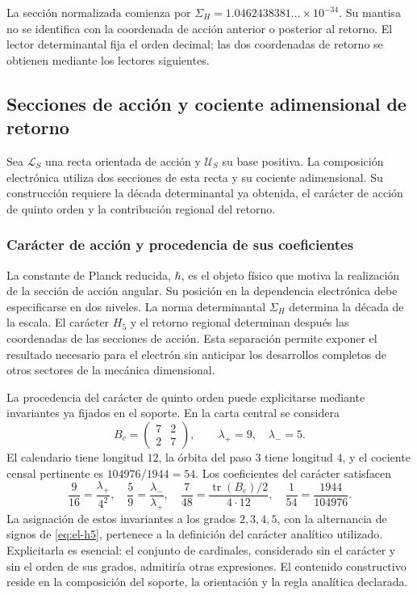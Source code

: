 La sección normalizada comienza por
\(\Sigma_H=1.0462438381\ldots\times10^{-34}\). Su mantisa no se
identifica con la coordenada de acción anterior o posterior al retorno.
El lector determinantal fija el orden decimal; las dos coordenadas de
retorno se obtienen mediante los lectores siguientes.


\subsection{Secciones de acción y cociente adimensional de retorno}

Sea \(\mathcal L_S\) una recta orientada de acción y \(\mathcal U_S\)
su base positiva. La composición electrónica utiliza dos secciones de
esta recta y su cociente adimensional. Su construcción requiere la
década determinantal ya obtenida, el carácter de acción de quinto orden
y la contribución regional del retorno.

\subsubsection{Carácter de acción y procedencia de sus coeficientes}
\label{sec:revision-planck}

La constante de Planck reducida, \(\hbar\), es el objeto físico que
motiva la realización de la sección de acción angular. Su posición en
la dependencia electrónica debe especificarse en dos niveles. La norma
determinantal \(\Sigma_H\) determina la década de la escala. El carácter
\(H_5\) y el retorno regional determinan después las coordenadas de las
secciones de acción. Esta separación permite exponer el resultado
necesario para el electrón sin anticipar los desarrollos completos de
otros sectores de la mecánica dimensional.

La procedencia del carácter de quinto orden puede explicitarse mediante
invariantes ya fijados en el soporte. En la carta central se considera
\[
 B_c=\begin{pmatrix}7&2\\2&7\end{pmatrix},
 \qquad \lambda_+=9,\quad\lambda_-=5.
\]
El calendario tiene longitud \(12\), la órbita del paso \(3\) tiene
longitud \(4\), y el cociente censal pertinente es
\(104976/1944=54\). Los coeficientes del carácter satisfacen
\begin{equation}
 \frac9{16}=\frac{\lambda_+}{4^2},\quad
 \frac59=\frac{\lambda_-}{\lambda_+},\quad
 \frac7{48}=\frac{\operatorname{tr}(B_c)/2}{4\cdot12},\quad
 \frac1{54}=\frac{1944}{104976}.
 \label{eq:revision-h5-coeficientes}
\end{equation}
La asignación de estos invariantes a los grados \(2,3,4,5\), con la
alternancia de signos de \eqref{eq:el-h5}, pertenece a la definición del
carácter analítico utilizado. Explicitarla es esencial: el conjunto de
cardinales, considerado sin el carácter y sin el orden de sus grados,
admitiría otras expresiones. El contenido constructivo reside en la
composición del soporte, la orientación y la regla analítica declarada.

